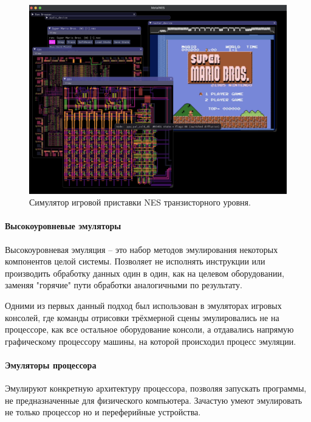 \begin{figure}[!htbp]
    \centering
    \begin{adjustbox}{max totalsize={\textwidth}{\textheight}}
        \includegraphics[]{images/metal-nes.png}
    \end{adjustbox}
    \caption{Симулятор игровой приставки NES транзисторного уровня.}\label{fig:metal-nes}
\end{figure}

\paragraph{Высокоуровневые эмуляторы}\label{high-level-emu}

Высокоуровневая эмуляция -- это набор методов эмулирования некоторых компонентов целой системы.
Позволяет не исполнять инструкции или производить обработку данных один в один, как на целевом оборудовании,
заменяя "горячие" пути обработки аналогичными по результату.

Одними из первых данный подход был использован в эмуляторах игровых консолей, где команды отрисовки трёхмерной сцены
эмулировались не на процессоре, как все остальное оборудование консоли, а отдавались напрямую
графическому процессору машины, на которой происходил процесс эмуляции.


\paragraph{Эмуляторы процессора}\label{cpu-emu}

Эмулируют конкретную архитектуру процессора, позволяя запускать программы, не предназначенные для физического компьютера.
Зачастую умеют эмулировать не только процессор но и переферийные устройства.


